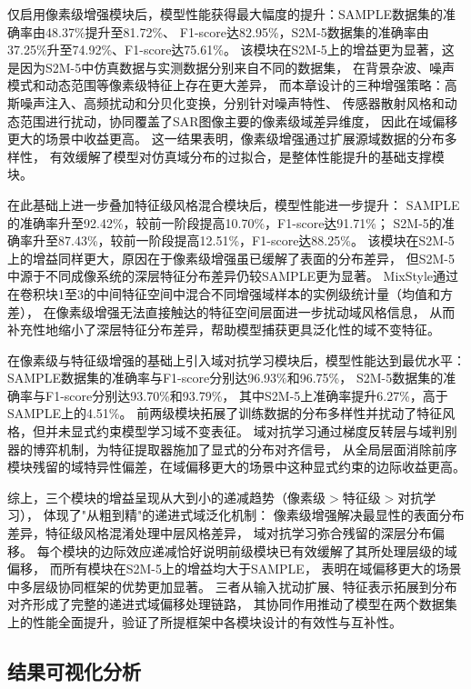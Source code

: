 仅启用像素级增强模块后，模型性能获得最大幅度的提升：SAMPLE数据集的准确率由48.37\%提升至81.72\%、
F1-score达82.95\%，S2M-5数据集的准确率由37.25\%升至74.92\%、F1-score达75.61\%。
该模块在S2M-5上的增益更为显著，这是因为S2M-5中仿真数据与实测数据分别来自不同的数据集，
在背景杂波、噪声模式和动态范围等像素级特征上存在更大差异，
而本章设计的三种增强策略：高斯噪声注入、高频扰动和分贝化变换，分别针对噪声特性、
传感器散射风格和动态范围进行扰动，协同覆盖了SAR图像主要的像素级域差异维度，
因此在域偏移更大的场景中收益更高。
这一结果表明，像素级增强通过扩展源域数据的分布多样性，
有效缓解了模型对仿真域分布的过拟合，是整体性能提升的基础支撑模块。

在此基础上进一步叠加特征级风格混合模块后，模型性能进一步提升：
SAMPLE的准确率升至92.42\%，较前一阶段提高10.70\%，F1-score达91.71\%；
S2M-5的准确率升至87.43\%，较前一阶段提高12.51\%，F1-score达88.25\%。
该模块在S2M-5上的增益同样更大，原因在于像素级增强虽已缓解了表面的分布差异，
但S2M-5中源于不同成像系统的深层特征分布差异仍较SAMPLE更为显著。
MixStyle通过在卷积块1至3的中间特征空间中混合不同增强域样本的实例级统计量（均值和方差），
在像素级增强无法直接触达的特征空间层面进一步扰动域风格信息，
从而补充性地缩小了深层特征分布差异，帮助模型捕获更具泛化性的域不变特征。

在像素级与特征级增强的基础上引入域对抗学习模块后，模型性能达到最优水平：
SAMPLE数据集的准确率与F1-score分别达96.93\%和96.75\%，
S2M-5数据集的准确率与F1-score分别达93.70\%和93.79\%，
其中S2M-5上准确率提升6.27\%，高于SAMPLE上的4.51\%。
前两级模块拓展了训练数据的分布多样性并扰动了特征风格，但并未显式约束模型学习域不变表征。
域对抗学习通过梯度反转层与域判别器的博弈机制，为特征提取器施加了显式的分布对齐信号，
从全局层面消除前序模块残留的域特异性偏差，在域偏移更大的场景中这种显式约束的边际收益更高。

综上，三个模块的增益呈现从大到小的递减趋势（像素级$>$特征级$>$对抗学习），
体现了"从粗到精"的递进式域泛化机制：
像素级增强解决最显性的表面分布差异，特征级风格混淆处理中层风格差异，
域对抗学习弥合残留的深层分布偏移。
每个模块的边际效应递减恰好说明前级模块已有效缓解了其所处理层级的域偏移，
而所有模块在S2M-5上的增益均大于SAMPLE，
表明在域偏移更大的场景中多层级协同框架的优势更加显著。
三者从输入扰动扩展、特征表示拓展到分布对齐形成了完整的递进式域偏移处理链路，
其协同作用推动了模型在两个数据集上的性能全面提升，验证了所提框架中各模块设计的有效性与互补性。



\subsection{结果可视化分析}

